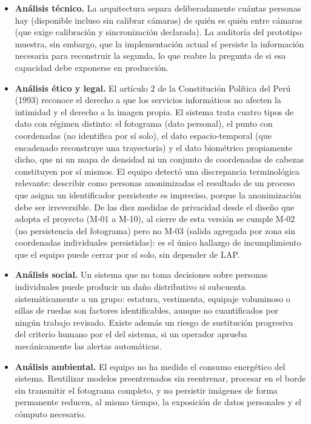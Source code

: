 \begin{itemize}
  \item \textbf{Análisis técnico.} La arquitectura separa deliberadamente cuántas personas hay
  (disponible incluso sin calibrar cámaras) de quién es quién entre cámaras (que exige
  calibración y sincronización declarada). La auditoría del prototipo muestra, sin
  embargo, que la implementación actual sí persiste la información necesaria para
  reconstruir la segunda, lo que reabre la pregunta de si esa capacidad debe exponerse
  en producción.

  \item \textbf{Análisis ético y legal.} El artículo 2 de la Constitución Política del Perú (1993)
  reconoce el derecho a que los servicios informáticos no afecten la intimidad y el
  derecho a la imagen propia. El sistema trata cuatro tipos de dato con régimen
  distinto: el fotograma (dato personal), el punto con coordenadas (no identifica por sí
  solo), el dato espacio-temporal (que encadenado reconstruye una trayectoria) y el
  dato biométrico propiamente dicho, que ni un mapa de densidad ni un conjunto de
  coordenadas de cabezas constituyen por sí mismos. El equipo detectó una
  discrepancia terminológica relevante: describir como personas anonimizadas el
  resultado de un proceso que asigna un identificador persistente es impreciso, porque
  la anonimización debe ser irreversible. De las diez medidas de privacidad desde el
  diseño que adopta el proyecto (M-01 a M-10), al cierre de esta versión se cumple
  M-02 (no persistencia del fotograma) pero no M-03 (salida agregada por zona sin
  coordenadas individuales persistidas): es el único hallazgo de incumplimiento que el
  equipo puede cerrar por sí solo, sin depender de LAP.

  \item \textbf{Análisis social.} Un sistema que no toma decisiones sobre personas individuales
  puede producir un daño distributivo si subcuenta sistemáticamente a un grupo:
  estatura, vestimenta, equipaje voluminoso o sillas de ruedas son factores
  identificables, aunque no cuantificados por ningún trabajo revisado. Existe además
  un riesgo de sustitución progresiva del criterio humano por el del sistema, si un
  operador aprueba mecánicamente las alertas automáticas.

  \item \textbf{Análisis ambiental.} El equipo no ha medido el consumo energético del sistema.
  Reutilizar modelos preentrenados sin reentrenar, procesar en el borde sin transmitir
  el fotograma completo, y no persistir imágenes de forma permanente reducen, al
  mismo tiempo, la exposición de datos personales y el cómputo necesario.
\end{itemize}
